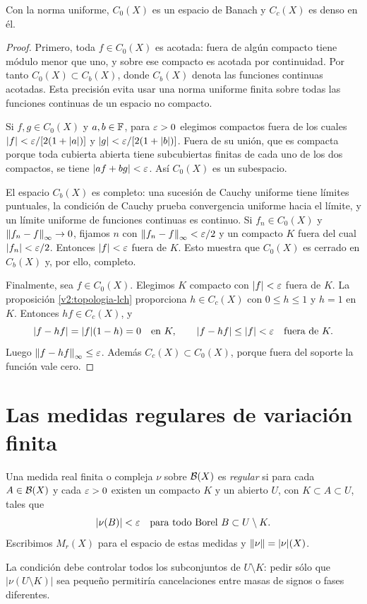 \begin{teorema}\label{v2:c0-banach}
Con la norma uniforme, $C_0(X)$ es un espacio de Banach y $C_c(X)$ es denso en él.
\end{teorema}
\begin{proof}
Primero, toda $f\in C_0(X)$ es acotada: fuera de algún compacto tiene módulo menor que uno, y sobre ese compacto es acotada por continuidad. Por tanto $C_0(X)\subset C_b(X)$, donde $C_b(X)$ denota las funciones continuas acotadas. Esta precisión evita usar una norma uniforme finita sobre todas las funciones continuas de un espacio no compacto.

Si $f,g\in C_0(X)$ y $a,b\in\mathbb F$, para $\varepsilon>0$ elegimos compactos fuera de los cuales $|f|<\varepsilon/[2(1+|a|)]$ y $|g|<\varepsilon/[2(1+|b|)]$. Fuera de su unión, que es compacta porque toda cubierta abierta tiene subcubiertas finitas de cada uno de los dos compactos, se tiene $|af+bg|<\varepsilon$. Así $C_0(X)$ es un subespacio.

El espacio $C_b(X)$ es completo: una sucesión de Cauchy uniforme tiene límites puntuales, la condición de Cauchy prueba convergencia uniforme hacia el límite, y un límite uniforme de funciones continuas es continuo. Si $f_n\in C_0(X)$ y $\left\lVert f_n-f\right\rVert_\infty\to0$, fijamos $n$ con $\left\lVert f_n-f\right\rVert_\infty<\varepsilon/2$ y un compacto $K$ fuera del cual $|f_n|<\varepsilon/2$. Entonces $|f|<\varepsilon$ fuera de $K$. Esto muestra que $C_0(X)$ es cerrado en $C_b(X)$ y, por ello, completo.

Finalmente, sea $f\in C_0(X)$. Elegimos $K$ compacto con $|f|<\varepsilon$ fuera de $K$. La proposición \ref{v2:topologia-lch} proporciona $h\in C_c(X)$ con $0\le h\le1$ y $h=1$ en $K$. Entonces $hf\in C_c(X)$, y
\[
|f-hf|=|f|(1-h)=0\quad\text{en }K,\qquad |f-hf|\le |f|<\varepsilon\quad\text{fuera de }K.
\]
Luego $\left\lVert f-hf\right\rVert_\infty\le\varepsilon$. Además $C_c(X)\subset C_0(X)$, porque fuera del soporte la función vale cero.
\end{proof}

\section{Las medidas regulares de variación finita}
\begin{definicion}
Una medida real finita o compleja $\nu$ sobre $\mathcal B(X)$ es \emph{regular} si para cada $A\in\mathcal B(X)$ y cada $\varepsilon>0$ existen un compacto $K$ y un abierto $U$, con $K\subset A\subset U$, tales que
\[
 |\nu(B)|<\varepsilon\quad\text{para todo Borel }B\subset U\setminus K.
\]
Escribimos $M_r(X)$ para el espacio de estas medidas y $\left\lVert\nu\right\rVert=|\nu|(X)$.
\end{definicion}
La condición debe controlar todos los subconjuntos de $U\setminus K$: pedir sólo que $|\nu(U\setminus K)|$ sea pequeño permitiría cancelaciones entre masas de signos o fases diferentes.

